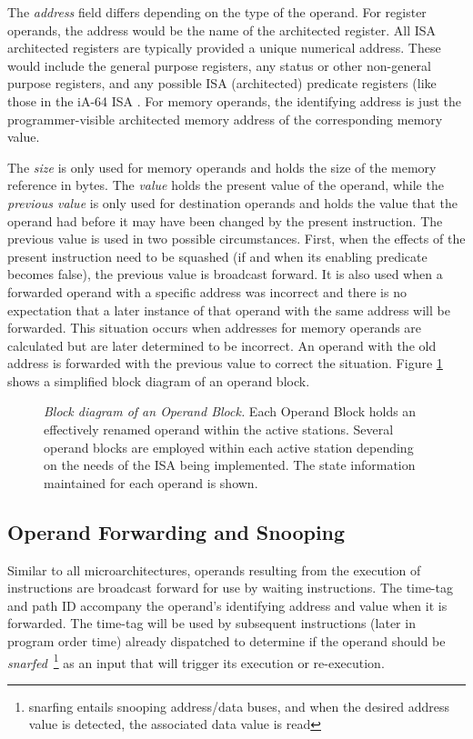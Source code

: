 \documentclass{book}
\begin{document}
The \textit{address} field differs
depending on the type of the operand.
For register operands, the address would be
the name of the architected register.
All ISA architected registers are typically provided a
unique numerical address.  These would include the
general purpose registers, any status or other non-general
purpose registers, and any possible ISA (architected) predicate registers
(like those in the iA-64 ISA \cite{intel99ia,schlansker00epic}.
For memory operands, the identifying address is just the
programmer-visible architected memory address of the corresponding
memory value.

The \textit{size} is only used for memory operands and holds
the size of the memory reference in bytes.
The \textit{value} holds the present value of the operand,
while the \textit{previous value} is only used for destination
operands and holds the value that the operand
had before it may have been changed by the present instruction.
The previous value is used in two possible circumstances.
First, when the effects of the present instruction need to be
squashed (if and when its enabling predicate becomes false),
the previous value is broadcast forward.
It is also used when a forwarded operand with a specific
address was incorrect 
and there is no expectation that a later instance
of that operand with the same address will be forwarded.
This situation occurs when addresses for memory operands are
calculated but are later determined to be incorrect.
An operand with the old address is forwarded with the previous
value to correct the situation.
Figure \ref{fig:operand} shows a simplified block diagram of
an operand block.
%
%
\begin{figure}
\centerline{}
\caption[Block diagram of an Operand Block]
{{\em Block diagram of an Operand Block.}
Each Operand Block holds an effectively renamed 
operand within the active stations.
Several operand blocks are employed within each active station
depending on the needs of the ISA being implemented.
The state information maintained for each operand
is shown.}
\label{fig:operand}
\end{figure}
%
%
\subsection{Operand Forwarding and Snooping}
%
Similar to all microarchitectures,
operands resulting from the execution of instructions
are broadcast forward for use by waiting instructions.
The time-tag and path ID accompany the operand's identifying
address and value when it is forwarded.
The time-tag will be used by subsequent 
instructions 
(later in program order time)
already dispatched
to determine if
the operand should be {\em snarfed}~\footnote{snarfing entails snooping
address/data buses, and when the desired address value is detected, 
the associated data value is read} 
as an input that will trigger
its execution or re-execution.
\end{document}
